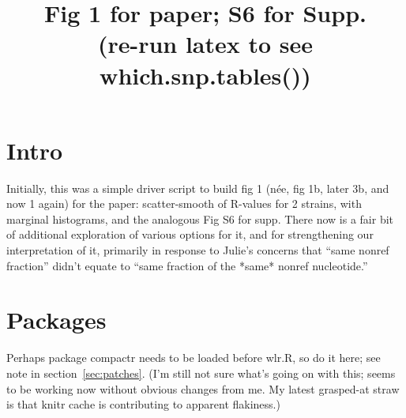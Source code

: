 \documentclass{article}\usepackage[]{graphicx}\usepackage[]{color}
\providecommand{\whichsnptables}{(re-run latex to see which.snp.tables())}
\begin{document}
\title{Fig 1 for paper; S6 for Supp.\\\large\whichsnptables}
\maketitle

\tableofcontents

\section{Intro}
Initially, this was a simple driver script to build fig 1 (n\'ee, fig 1b, later 3b, and now 1 again) for the paper: scatter-smooth of R-values for 2 strains, with marginal histograms, and the analogous Fig S6 for supp. There now is a fair bit of additional exploration of various options for it, and for strengthening our interpretation of it, primarily in response to Julie's concerns that ``same nonref fraction'' didn't equate to ``same fraction of the *same* nonref nucleotide.''

\section{Packages}

Perhaps package compactr needs to be loaded before wlr.R, so do it here; see note in section~\ref{sec:patches}.  (I'm still not sure what's going on with this; seems to be working now without obvious changes from me.  My latest grasped-at straw is that knitr cache is contributing to apparent flakiness.)
\end{document}
